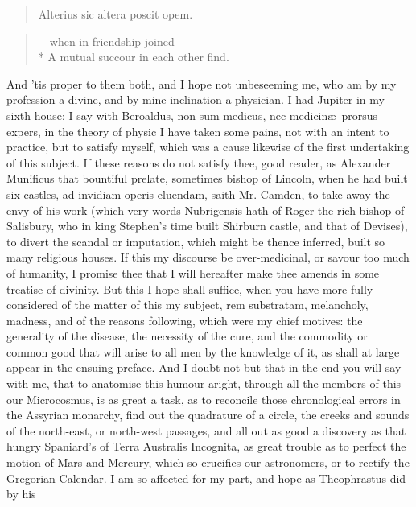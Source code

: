 {\begin{verse}
\textlatin{Alterius sic altera poscit opem.}
\end{verse}

\begin{verse}
---when in friendship joined\\*
A mutual succour in each other find.
\end{verse}

And 'tis proper to them both, and I hope not unbeseeming me, who am by
my profession a divine, and by mine inclination a physician. I had
Jupiter in my sixth house; I say with Beroaldus, non sum medicus,
nec medicin\ae{}\ prorsus expers, in the theory of physic I have taken some
pains, not with an intent to practice, but to satisfy myself, which was
a cause likewise of the first undertaking of this subject.
If these reasons do not satisfy thee, good reader, as Alexander
Munificus that bountiful prelate, sometimes bishop of Lincoln, when he
had built six castles, ad invidiam operis eluendam, saith Mr.
Camden, to take away the envy of his work (which very words Nubrigensis
hath of Roger the rich bishop of Salisbury, who in king Stephen's time
built Shirburn castle, and that of Devises), to divert the scandal or
imputation, which might be thence inferred, built so many religious
houses. If this my discourse be over-medicinal, or savour too much of
humanity, I promise thee that I will hereafter make thee amends in some
treatise of divinity. But this I hope shall suffice, when you have more
fully considered of the matter of this my subject, rem substratam,
melancholy, madness, and of the reasons following, which were my chief
motives: the generality of the disease, the necessity of the cure, and
the commodity or common good that will arise to all men by the
knowledge of it, as shall at large appear in the ensuing preface. And I
doubt not but that in the end you will say with me, that to anatomise
this humour aright, through all the members of this our Microcosmus, is
as great a task, as to reconcile those chronological errors in the
Assyrian monarchy, find out the quadrature of a circle, the creeks and
sounds of the north-east, or north-west passages, and all out as good a
discovery as that hungry Spaniard's of Terra Australis Incognita,
as great trouble as to perfect the motion of Mars and Mercury, which so
crucifies our astronomers, or to rectify the Gregorian Calendar. I am
so affected for my part, and hope as Theophrastus did by his
}
